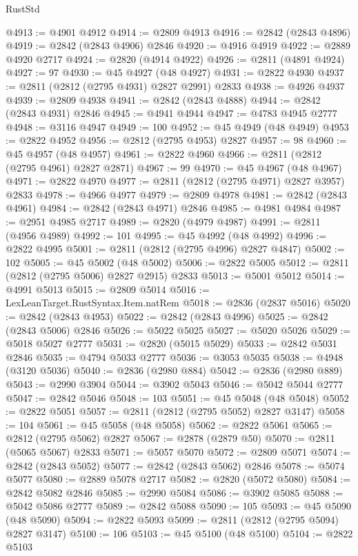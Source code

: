 \begin{lexlean}{RustStd}
\begin{coremodule}
{\begin{coremodule}
{{{{{{{{{{{{{{{{{{{{{{{{{{{{{{{{{@4913 := @4901 @4912
@4914 := @2809 @4913
@4916 := @2842 (@2843 @4896)
@4919 := @2842 (@2843 @4906) @2846
@4920 := @4916 @4919
@4922 := @2889 @4920 @2717
@4924 := @2820 (@4914 @4922)
@4926 := @2811 (@4891 @4924)
@4927 := 97
@4930 := @45 @4927 (@48 @4927)
@4931 := @2822 @4930
@4937 := @2811 (@2812 (@2795 @4931) @2827 @2991) @2833
@4938 := @4926 @4937
@4939 := @2809 @4938
@4941 := @2842 (@2843 @4888)
@4944 := @2842 (@2843 @4931) @2846
@4945 := @4941 @4944
@4947 := @4783 @4945 @2777
@4948 := @3116 @4947
@4949 := 100
@4952 := @45 @4949 (@48 @4949)
@4953 := @2822 @4952
@4956 := @2812 (@2795 @4953) @2827
@4957 := 98
@4960 := @45 @4957 (@48 @4957)
@4961 := @2822 @4960
@4966 := @2811 (@2812 (@2795 @4961) @2827 @2871)
@4967 := 99
@4970 := @45 @4967 (@48 @4967)
@4971 := @2822 @4970
@4977 := @2811 (@2812 (@2795 @4971) @2827 @3957) @2833
@4978 := @4966 @4977
@4979 := @2809 @4978
@4981 := @2842 (@2843 @4961)
@4984 := @2842 (@2843 @4971) @2846
@4985 := @4981 @4984
@4987 := @2951 @4985 @2717
@4989 := @2820 (@4979 @4987)
@4991 := @2811 (@4956 @4989)
@4992 := 101
@4995 := @45 @4992 (@48 @4992)
@4996 := @2822 @4995
@5001 := @2811 (@2812 (@2795 @4996) @2827 @4847)
@5002 := 102
@5005 := @45 @5002 (@48 @5002)
@5006 := @2822 @5005
@5012 := @2811 (@2812 (@2795 @5006) @2827 @2915) @2833
@5013 := @5001 @5012
@5014 := @4991 @5013
@5015 := @2809 @5014
@5016 := LexLeanTarget.RustSyntax.Item.natRem
@5018 := @2836 (@2837 @5016)
@5020 := @2842 (@2843 @4953)
@5022 := @2842 (@2843 @4996)
@5025 := @2842 (@2843 @5006) @2846
@5026 := @5022 @5025
@5027 := @5020 @5026
@5029 := @5018 @5027 @2777
@5031 := @2820 (@5015 @5029)
@5033 := @2842 @5031 @2846
@5035 := @4794 @5033 @2777
@5036 := @3053 @5035
@5038 := @4948 (@3120 @5036)
@5040 := @2836 (@2980 @884)
@5042 := @2836 (@2980 @889)
@5043 := @2990 @3904
@5044 := @3902 @5043
@5046 := @5042 @5044 @2777
@5047 := @2842 @5046
@5048 := 103
@5051 := @45 @5048 (@48 @5048)
@5052 := @2822 @5051
@5057 := @2811 (@2812 (@2795 @5052) @2827 @3147)
@5058 := 104
@5061 := @45 @5058 (@48 @5058)
@5062 := @2822 @5061
@5065 := @2812 (@2795 @5062) @2827
@5067 := @2878 (@2879 @50)
@5070 := @2811 (@5065 @5067) @2833
@5071 := @5057 @5070
@5072 := @2809 @5071
@5074 := @2842 (@2843 @5052)
@5077 := @2842 (@2843 @5062) @2846
@5078 := @5074 @5077
@5080 := @2889 @5078 @2717
@5082 := @2820 (@5072 @5080)
@5084 := @2842 @5082 @2846
@5085 := @2990 @5084
@5086 := @3902 @5085
@5088 := @5042 @5086 @2777
@5089 := @2842 @5088
@5090 := 105
@5093 := @45 @5090 (@48 @5090)
@5094 := @2822 @5093
@5099 := @2811 (@2812 (@2795 @5094) @2827 @3147)
@5100 := 106
@5103 := @45 @5100 (@48 @5100)
@5104 := @2822 @5103
}}}}}}}}}}}}}}}}}}}}}}}}}}}}}}}}}
\end{coremodule}}
\end{coremodule}
\end{lexlean}
